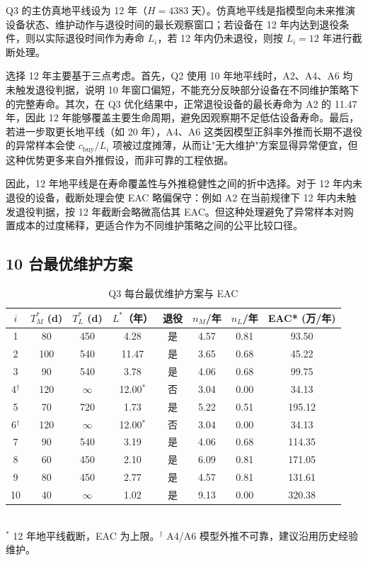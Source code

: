 \documentclass[12pt, a4paper, fontset=fandol]{ctexart}
\theoremstyle{definition}
\begin{document}
Q3 的主仿真地平线设为 12 年（$H=4383$ 天）。仿真地平线是指模型向未来推演设备状态、维护动作与退役时间的最长观察窗口；若设备在 12 年内达到退役条件，则以实际退役时间作为寿命 $L_i$，若 12 年内仍未退役，则按 $L_i=12$ 年进行截断处理。

选择 12 年主要基于三点考虑。首先，Q2 使用 10 年地平线时，A2、A4、A6 均未触发退役判据，说明 10 年窗口偏短，不能充分反映部分设备在不同维护策略下的完整寿命。其次，在 Q3 优化结果中，正常退役设备的最长寿命为 A2 的 11.47 年，因此 12 年能够覆盖主要生命周期，避免因观察期不足低估设备寿命。最后，若进一步取更长地平线（如 20 年），A4、A6 这类因模型正斜率外推而长期不退役的异常样本会使 $c_{\text{buy}}/L_i$ 项被过度摊薄，从而让"无大维护"方案显得异常便宜，但这种优势更多来自外推假设，而非可靠的工程依据。

因此，12 年地平线是在寿命覆盖性与外推稳健性之间的折中选择。对于 12 年内未退役的设备，截断处理会使 EAC 略偏保守：例如 A2 在当前规律下 12 年内未触发退役判据，按 12 年截断会略微高估其 EAC。但这种处理避免了异常样本对购置成本的过度稀释，更适合作为不同维护策略之间的公平比较口径。

\subsection{10 台最优维护方案}

\begin{table}[H]
\centering
\caption{Q3 每台最优维护方案与 EAC}
\begin{tabular}{cccccccc}
\toprule
$i$ & $T_M^*$ (d) & $T_L^*$ (d) & $L^*$（年） & 退役 & $n_M$/年 & $n_L$/年 & EAC* (万/年) \\
\midrule
1  & 80  & 450 & 4.28 & 是 & 4.57 & 0.81 & 93.50 \\
2  & 100 & 540 & 11.47 & 是 & 3.65 & 0.68 & 45.22 \\
3  & 90  & 540 & 3.78 & 是 & 4.06 & 0.68 & 99.75 \\
4$^\dagger$  & 120 & $\infty$ & 12.00$^*$ & 否 & 3.04 & 0.00 & 34.13 \\
5  & 70  & 720 & 1.73 & 是 & 5.22 & 0.51 & 195.12 \\
6$^\dagger$  & 120 & $\infty$ & 12.00$^*$ & 否 & 3.04 & 0.00 & 34.13 \\
7  & 90 & 540 & 3.19 & 是 & 4.06 & 0.68 & 114.35 \\
8  & 60  & 450 & 2.10 & 是 & 6.09 & 0.81 & 171.05 \\
9  & 80  & 450 & 2.77 & 是 & 4.57 & 0.81 & 131.61 \\
10 & 40  & $\infty$ & 1.02 & 是 & 9.13 & 0.00 & 320.38 \\
\bottomrule
\end{tabular}
\\[0.5em]
\footnotesize $^*$ 12 年地平线截断，EAC 为上限。\quad $^\dagger$ A4/A6 模型外推不可靠，建议沿用历史经验维护。
\end{table}
\end{document}
